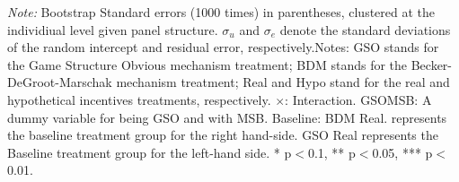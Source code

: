 \documentclass[12pt]{article}
\begin{document}
\begin{table}[H]
{\begin{tabular}{l*{1}{cc}}
    \end{tabular}
    }



\begin{tablenotes}
            \footnotesize
            \item \textit{Note:} Bootstrap Standard errors (1000 times) in parentheses, clustered at the individiual level given panel structure. $\sigma_u$ and $\sigma_e$ denote the standard deviations of the random intercept and residual error, respectively.Notes: GSO stands for the Game Structure Obvious mechanism treatment; BDM stands for the Becker-DeGroot-Marschak mechanism treatment; Real and Hypo stand for the real and hypothetical incentives treatments, respectively. $\times$: Interaction. GSOMSB: A dummy variable for being GSO and with MSB. Baseline: BDM Real. represents the baseline treatment group for the right hand-side. GSO Real represents the Baseline treatment group for the left-hand side. * p$<$0.1, ** p$<$0.05, *** p$<$0.01.
        \end{tablenotes}
\end{table}











\clearpage
\end{document}
